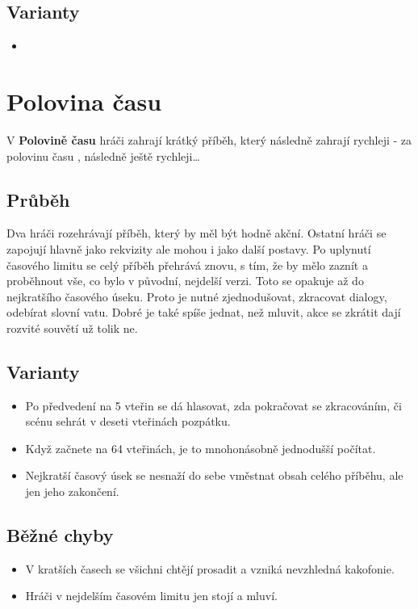 \subsection{Varianty} \begin{itemize}
\item {}
\end{itemize}
 
 
 
 
 
\needspace{5cm} \section{Polovina času} \label{polovina času}  
 
V \textbf{Polovině času}{} hráči zahrají krátký příběh, který následně zahrají rychleji -  za polovinu času , následně ještě rychleji… 
 
\subsection{ Průběh } Dva hráči rozehrávají příběh, který by měl být hodně akční. Ostatní hráči se zapojují hlavně jako rekvizity ale mohou i jako další postavy. Po uplynutí časového limitu se celý příběh přehrává znovu, s tím, že by mělo zaznít a proběhnout vše, co bylo v původní, nejdelší verzi. Toto se opakuje až do nejkratšího časového úseku. Proto je nutné zjednodušovat, zkracovat dialogy, odebírat slovní vatu. Dobré je také spíše jednat, než mluvit, akce se zkrátit dají rozvité souvětí už tolik ne. 
 
\subsection{ Varianty } \begin{itemize}
\item Po předvedení na 5 vteřin se dá hlasovat, zda pokračovat se zkracováním, či scénu sehrát v deseti vteřinách pozpátku.
\item Když začnete na 64 vteřinách, je to mnohonásobně jednodušší počítat.
\item Nejkratší časový úsek se nesnaží do sebe vměstnat obsah celého příběhu, ale jen jeho zakončení.
\end{itemize}
 
\subsection{ Běžné chyby } \begin{itemize}
\item V kratších časech se všichni chtějí prosadit a vzniká nevzhledná kakofonie.
\item Hráči v nejdelším časovém limitu jen stojí a mluví.
\end{itemize}
 
